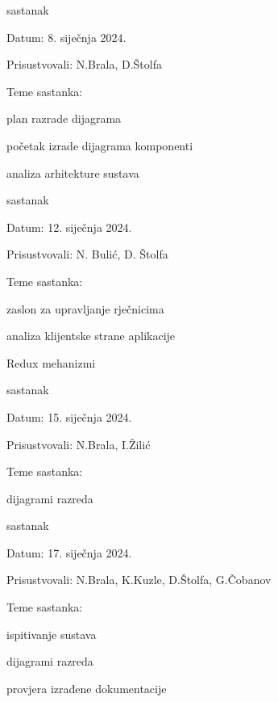 \begin{packed_enum}
			\item  sastanak
			\item[] \begin{packed_item}
				\item Datum: 8. siječnja 2024.
				\item Prisustvovali: N.Brala, D.Štolfa
				\item Teme sastanka:
				\begin{packed_item}
					\item  plan razrade dijagrama
					\item  početak izrade dijagrama komponenti
					\item  analiza arhitekture sustava
				\end{packed_item}
			\end{packed_item}

			\item  sastanak
			\item[] \begin{packed_item}
				\item Datum: 12. siječnja 2024.
				\item Prisustvovali: N. Bulić, D. Štolfa
				\item Teme sastanka:
				\begin{packed_item}
					\item  zaslon za upravljanje rječnicima
					\item  analiza klijentske strane aplikacije
					\item  Redux mehanizmi
				\end{packed_item}
			\end{packed_item}

			\item  sastanak
			\item[] \begin{packed_item}
				\item Datum: 15. siječnja 2024.
				\item Prisustvovali: N.Brala, I.Žilić
				\item Teme sastanka:
				\begin{packed_item}
					\item  dijagrami razreda
			\end{packed_item}
		\end{packed_item}

			\item  sastanak
			\item[] \begin{packed_item}
				\item Datum: 17. siječnja 2024.
				\item Prisustvovali: N.Brala, K.Kuzle, D.Štolfa, G.Čobanov
				\item Teme sastanka:
				\begin{packed_item}
					\item  ispitivanje sustava
					\item dijagrami razreda
					\item provjera izrađene dokumentacije
			\end{packed_item}


\end{packed_item}
\end{packed_enum}
